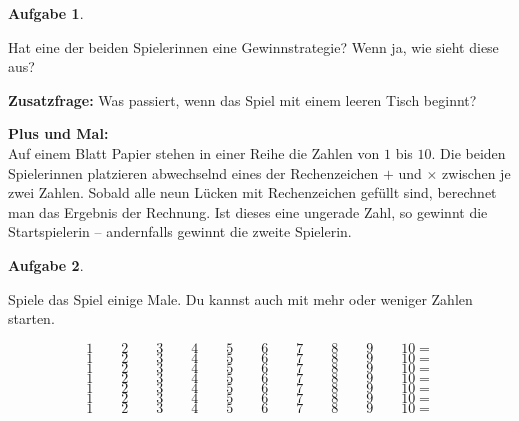 \documentclass[a4paper,ngerman,12pt]{scrartcl}
\theoremstyle{definition}
\newtheorem{aufg}{Aufgabe}
\newenvironment{aufgabe}[1][]
		{\begin{shaded}\vspace{-0.3cm}\begin{aufg}\emph{#1} \par\medskip}
		{\end{aufg}\vspace{-0.3cm}\end{shaded}}
\newenvironment{spiel}[1][]{\begin{framed}\textbf{#1:}\\}{\end{framed}}
\theoremstyle{plain}
\theoremstyle{remark}
\begin{document}
\begin{aufgabe}
	Hat eine der beiden Spielerinnen eine Gewinnstrategie? Wenn ja, wie sieht diese aus?
	
	\textbf{Zusatzfrage:} Was passiert, wenn das Spiel mit einem leeren Tisch beginnt?
\end{aufgabe}


\newpage
\begin{spiel}[Plus und Mal]
	Auf einem Blatt Papier stehen in einer Reihe die Zahlen von $1$ bis $10$. Die beiden Spielerinnen platzieren abwechselnd eines der Rechenzeichen $+$ und $\times$ zwischen je zwei Zahlen. Sobald alle neun Lücken mit Rechenzeichen gefüllt sind, berechnet man das Ergebnis der Rechnung. Ist dieses eine ungerade Zahl, so gewinnt die Startspielerin -- andernfalls gewinnt die zweite Spielerin.
\end{spiel}

\begin{aufgabe}
	Spiele das Spiel einige Male. Du kannst auch mit mehr oder weniger Zahlen starten.
\end{aufgabe}

\begin{center}\Large
	\[1 \qquad 2 \qquad 3 \qquad 4 \qquad 5 \qquad 6 \qquad 7 \qquad 8 \qquad 9 \qquad 10 = \]\vspace{.5em}
	\[1 \qquad 2 \qquad 3 \qquad 4 \qquad 5 \qquad 6 \qquad 7 \qquad 8 \qquad 9 \qquad 10 = \]\vspace{.5em}
	\[1 \qquad 2 \qquad 3 \qquad 4 \qquad 5 \qquad 6 \qquad 7 \qquad 8 \qquad 9 \qquad 10 = \]\vspace{.5em}
	\[1 \qquad 2 \qquad 3 \qquad 4 \qquad 5 \qquad 6 \qquad 7 \qquad 8 \qquad 9 \qquad 10 = \]\vspace{.5em}
	\[1 \qquad 2 \qquad 3 \qquad 4 \qquad 5 \qquad 6 \qquad 7 \qquad 8 \qquad 9 \qquad 10 = \]\vspace{.5em}
	\[1 \qquad 2 \qquad 3 \qquad 4 \qquad 5 \qquad 6 \qquad 7 \qquad 8 \qquad 9 \qquad 10 = \]\vspace{.5em}
	\[1 \qquad 2 \qquad 3 \qquad 4 \qquad 5 \qquad 6 \qquad 7 \qquad 8 \qquad 9 \qquad 10 = \]\vspace{.5em}
\end{center}
\end{document}
